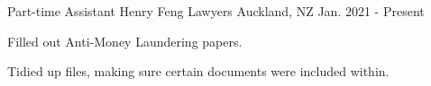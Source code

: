 

\begin{cventries}

  \cventry
    {Part-time Assistant} %
    {Henry Feng Lawyers} %
    {Auckland, NZ} %
    {Jan. 2021 - Present} %
    {
      \begin{cvitems} %
        \item {Filled out Anti-Money Laundering papers.}
        \item {Tidied up files, making sure certain documents were included within.}
      \end{cvitems}
    }


\end{cventries}
